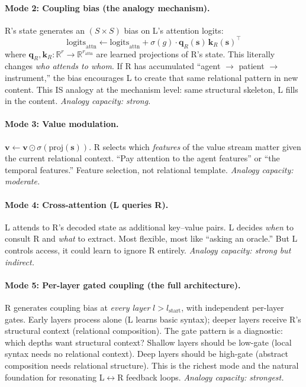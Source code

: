 \documentclass[11pt, a4paper]{article}
\newcommand{\R}{\mathbb{R}}
\theoremstyle{plain}
\theoremstyle{definition}
\theoremstyle{remark}
\begin{document}
\paragraph{Mode 2: Coupling bias (the analogy mechanism).}
R's state generates an $(S \times S)$ bias on L's attention logits:
\begin{equation}
\mathrm{logits}_{\mathrm{attn}} \gets \mathrm{logits}_{\mathrm{attn}} + \sigma(g) \cdot \mathbf{q}_R(\mathbf{s}) \, \mathbf{k}_R(\mathbf{s})^\top
\end{equation}
where $\mathbf{q}_R, \mathbf{k}_R: \R^r \to \R^{r_{\mathrm{attn}}}$ are learned projections of R's state.
This literally changes \emph{who attends to whom}.
If R has accumulated ``agent $\to$ patient $\to$ instrument,'' the bias encourages L to create that same relational pattern in new content.
This IS analogy at the mechanism level: same structural skeleton, L fills in the content.
\emph{Analogy capacity: strong.}

\paragraph{Mode 3: Value modulation.}
$\mathbf{v} \gets \mathbf{v} \odot \sigma(\mathrm{proj}(\mathbf{s}))$.
R selects which \emph{features} of the value stream matter given the current relational context.
``Pay attention to the agent features'' or ``the temporal features.''
Feature selection, not relational template.
\emph{Analogy capacity: moderate.}

\paragraph{Mode 4: Cross-attention (L queries R).}
L attends to R's decoded state as additional key--value pairs.
L decides \emph{when} to consult R and \emph{what} to extract.
Most flexible, most like ``asking an oracle.''
But L controls access, it could learn to ignore R entirely.
\emph{Analogy capacity: strong but indirect.}

\paragraph{Mode 5: Per-layer gated coupling (the full architecture).}
R generates coupling bias at \emph{every layer} $l > l_{\mathrm{start}}$, with independent per-layer gates.
Early layers process alone (L learns basic syntax); deeper layers receive R's structural context (relational composition).
The gate pattern is a diagnostic: which depths want structural context?
Shallow layers should be low-gate (local syntax needs no relational context).
Deep layers should be high-gate (abstract composition needs relational structure).
This is the richest mode and the natural foundation for resonating L$\leftrightarrow$R feedback loops.
\emph{Analogy capacity: strongest.}
\end{document}
